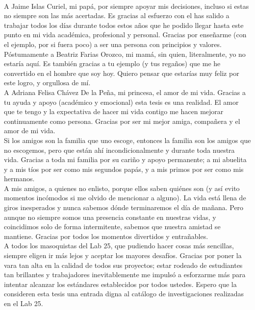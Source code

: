 \documentclass[
12pt, %
spanish, %
onehalfspacing, %
headsepline, %
]{MastersDoctoralThesis} %
\begin{document}

\begin{acknowledgements}
\addchaptertocentry{\acknowledgementname} %
\\
A Jaime Islas Curiel, mi papá, por siempre apoyar mis decisiones, incluso si estas no siempre son las más acertadas. Es gracias al esfuerzo con el has salido a trabajar todos los días durante todos estos años que he podido llegar hasta este punto en mi vida académica, profesional y personal. Gracias por enseñarme (con el ejemplo, por si fuera poco) a ser una persona con principios y valores.\\

Póstumamente a Beatriz Farias Orozco, mi mamá, sin quien, literalmente, yo no estaría aquí. Es también gracias a tu ejemplo (y tus regaños) que me he convertido en el hombre que soy hoy. Quiero pensar que estarías muy feliz por este logro, y orgullosa de mí.\\

A Adriana Felisa Chávez De la Peña, mi princesa, el amor de mi vida. Gracias a tu ayuda y apoyo (académico y emocional) esta tesis es una realidad. El amor que te tengo y la expectativa de hacer mi vida contigo me hacen mejorar continuamente como persona. Gracias por ser mi mejor amiga, compañera y el amor de mi vida.\\

Si los amigos son la familia que uno escoge, entonces la familia son los amigos que no escogemos, pero que están ahí incondicionalmente y durante toda nuestra vida. Gracias a toda mi familia por su cariño y apoyo permanente; a mi abuelita y a mis tíos por ser como mis segundos papás, y a mis primos por ser como mis hermanos.\\

A mis amigos, a quienes no enlisto, porque ellos saben quiénes son (y así evito momentos incómodos si me olvido de mencionar a alguno). La vida está llena de giros inesperados y nunca sabemos dónde terminaremos el día de mañana. Pero aunque no siempre somos una presencia constante en nuestras vidas, y coincidimos solo de forma intermitente, sabemos que nuestra amistad se mantiene. Gracias por todos los momentos divertidos y entrañables.\\

A todos los masoquistas del Lab 25, que pudiendo hacer cosas más sencillas, siempre eligen ir más lejos y aceptar los mayores desafíos. Gracias por poner la vara tan alta en la calidad de todos sus proyectos; estar rodeado de estudiantes tan brillantes y trabajadores inevitablemente me impulsó a esforzarme más para intentar alcanzar los estándares establecidos por todos ustedes. Espero que la consideren esta tesis una entrada digna al catálogo de investigaciones realizadas en el Lab 25.\\


\end{acknowledgements}
\end{document}
